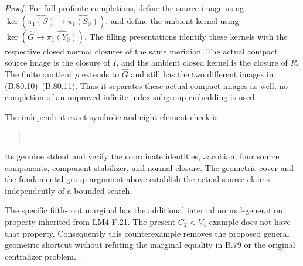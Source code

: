 \begin{proof}
For full profinite completions, define the source image using
\(\ker(\widehat{\pi_1(S)}\to\widehat{\pi_1(S_0)})\), and
define the ambient kernel using
\(\ker(\widehat G\to\widehat{\pi_1(Y_0)})\). The filling
presentations identify these kernels with the respective closed
normal closures of the same meridian. The actual compact source
image is the closure of \(I\), and the ambient closed kernel is
the closure of \(R\). The finite quotient \(\rho\) extends to
\(\widehat G\) and still has the two different images in
(B.80.10)--(B.80.11). Thus it separates these actual compact
images as well; no completion of an unproved infinite-index
subgroup embedding is used.

The independent exact symbolic and eight-element check is
\begin{quote}\small
{}.
\end{quote}
Its genuine stdout and
verify the coordinate identities, Jacobian, four source components,
component stabilizer, and normal closure. The geometric cover and
the fundamental-group argument above establish the actual-source
claims independently of a bounded search.

The specific fifth-root marginal has the additional internal
normal-generation property inherited from LM4 F.21. The present
\(C_2<V_4\) example does not have that property. Consequently this
counterexample removes the proposed general geometric shortcut
without refuting the marginal equality in B.79 or the original
centralizer problem.
\end{proof}
